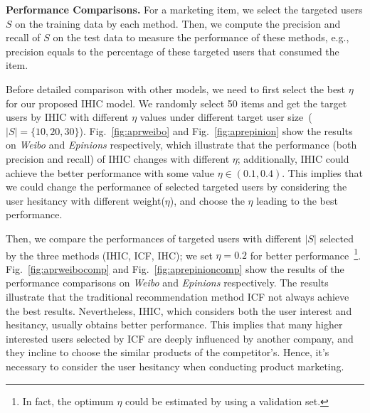 \documentclass{llncs}
\begin{document}
\textbf{Performance Comparisons.} For a marketing item, we select the targeted users $S$ on the training data by each method. Then, we compute the precision and recall of $S$ on the test data to measure the performance of these methods, e.g., precision equals to the percentage of these targeted users that consumed the item.

Before detailed comparison with other models, we need to first select the best $\eta$ for our proposed IHIC model. We randomly select 50 items and get the target users by IHIC with different $\eta$ values under different target user size~($|S|=\{10,20,30\}$). 
Fig.~\ref{fig:aprweibo} and Fig.~\ref{fig:aprepinion} show the results on \emph{Weibo} and \emph{Epinions} respectively, which illustrate that the performance (both precision and recall) of IHIC changes with different $\eta$;
 additionally, IHIC could achieve the better performance with some value $\eta \in (0.1, 0.4)$. This implies that we could change the performance of selected targeted users by considering the user hesitancy with different weight($\eta$), and choose the $\eta$ leading to the best performance.


Then, we compare the performances of targeted users with different $|S|$ selected by the three methods (IHIC, ICF, IHC); 
we set $\eta=0.2$ for better performance~\footnote{In fact, the optimum $\eta$  could be estimated by using a validation set.}. Fig.~\ref{fig:aprweibocomp} and Fig.~\ref{fig:aprepinioncomp} show the results of the performance comparisons on \emph{Weibo} and \emph{Epinions} respectively. The results illustrate that the traditional recommendation method ICF not always achieve the best results. Nevertheless, IHIC, which considers both the user interest and hesitancy, usually obtains better performance. This implies that many higher interested users selected by ICF are deeply influenced by another company, and they incline to choose the similar products of the competitor's.
Hence, it's necessary to consider the user hesitancy when conducting product marketing.
\end{document}
